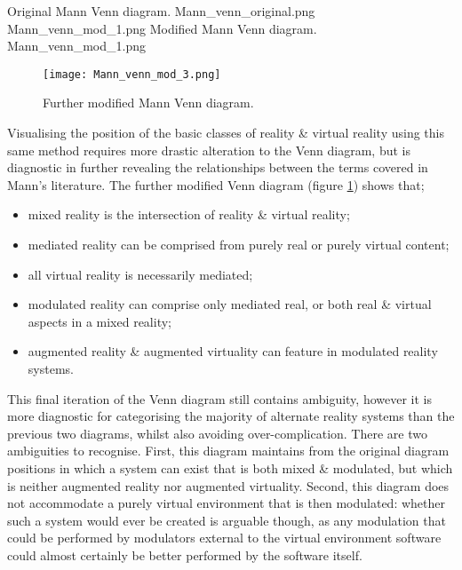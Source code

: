 {Original Mann Venn diagram.} {Mann_venn_original.png}
       {Mann_venn_mod_1.png} {Modified Mann Venn diagram.} {Mann_venn_mod_1.png}

\begin{figure}[h]
\centering
  \texttt{[image: Mann\_venn\_mod\_3.png]}
  \caption{Further modified Mann Venn diagram.}
  \label{Mann_venn_mod_3.png}
\end{figure}

Visualising the position of the basic classes of reality \& virtual reality using this same method requires more drastic alteration to the Venn diagram, but is diagnostic in further revealing the relationships between the terms covered in Mann's literature. The further modified Venn diagram (figure \ref{Mann_venn_mod_3.png}) shows that;
\begin{itemize}
	\item mixed reality is the intersection of reality \& virtual reality;
	\item mediated reality can be comprised from purely real or purely virtual content;
	\item all virtual reality is necessarily mediated;
	\item modulated reality can comprise only mediated real, or both real \& virtual aspects in a mixed reality;
	\item augmented reality \& augmented virtuality can feature in modulated reality systems.
\end{itemize}

This final iteration of the Venn diagram still contains ambiguity, however it is more diagnostic for categorising the majority of alternate reality systems than the previous two diagrams, whilst also avoiding over-complication. There are two ambiguities to recognise. First, this diagram maintains from the original diagram positions in which a system can exist that is both mixed \& modulated, but which is neither augmented reality nor augmented virtuality. Second, this diagram does not accommodate a purely virtual environment that is then modulated: whether such a system would ever be created is arguable though, as any modulation that could be performed by modulators external to the virtual environment software could almost certainly be better performed by the software itself.


